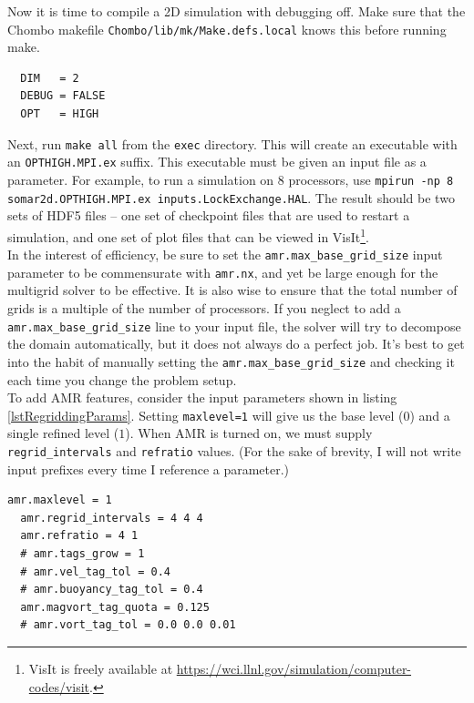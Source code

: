 \documentclass[12pt]{article}
\begin{document}
Now it is time to compile a 2D simulation with debugging off. Make sure that the Chombo makefile \texttt{Chombo/lib/mk/Make.defs.local} knows this before running make.
\begin{lstlisting}
  DIM   = 2
  DEBUG = FALSE
  OPT   = HIGH
\end{lstlisting}
Next, run \texttt{make all} from the \texttt{exec} directory. This will create an executable with an \texttt{OPTHIGH.MPI.ex} suffix. This executable must be given an input file as a parameter. For example, to run a simulation on 8 processors, use \texttt{mpirun -np 8 somar2d.OPTHIGH.MPI.ex inputs.LockExchange.HAL}. The result should be two sets of HDF5 files -- one set of checkpoint files that are used to restart a simulation, and one set of plot files that can be viewed in VisIt\footnote{VisIt is freely available at \url{https://wci.llnl.gov/simulation/computer-codes/visit}.}.\\

In the interest of efficiency, be sure to set the \texttt{amr.max\_base\_grid\_size} input parameter to be commensurate with \texttt{amr.nx}, and yet be large enough for the multigrid solver to be effective. It is also wise to ensure that the total number of grids is a multiple of the number of processors. If you neglect to add a \texttt{amr.max\_base\_grid\_size} line to your input file, the solver will try to decompose the domain automatically, but it does not always do a perfect job. It's best to get into the habit of manually setting the \texttt{amr.max\_base\_grid\_size} and checking it each time you change the problem setup.\\

To add AMR features, consider the input parameters shown in listing \ref{lstRegriddingParams}. Setting \texttt{maxlevel=1} will give us the base level ($0$) and a single refined level ($1$). When AMR is turned on, we must supply \texttt{regrid\_intervals} and \texttt{refratio} values. (For the sake of brevity, I will not write input prefixes every time I reference a parameter.)
\begin{lstlisting}[caption={The regridding input parameters.},label=lstRegriddingParams]
  amr.maxlevel = 1
  amr.regrid_intervals = 4 4 4
  amr.refratio = 4 1
  # amr.tags_grow = 1
  # amr.vel_tag_tol = 0.4
  # amr.buoyancy_tag_tol = 0.4
  amr.magvort_tag_quota = 0.125
  # amr.vort_tag_tol = 0.0 0.0 0.01
\end{lstlisting}
\end{document}

